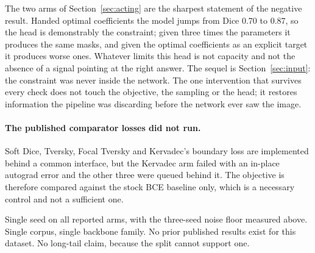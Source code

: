 \documentclass[11pt,letterpaper]{article}
\begin{document}
The two arms of Section~\ref{sec:acting} are the sharpest statement of the
negative result. Handed optimal coefficients the model jumps from Dice 0.70 to
0.87, so the head is demonstrably the constraint; given three times the
parameters it produces the same masks, and given the optimal coefficients as an
explicit target it produces worse ones. Whatever limits this head is not
capacity and not the absence of a signal pointing at the right answer. The sequel is
Section~\ref{sec:input}: the constraint was never inside the network. The one
intervention that survives every check does not touch the objective, the
sampling or the head; it restores information the pipeline was discarding
before the network ever saw the image.

\paragraph{The published comparator losses did not run.} Soft Dice, Tversky,
Focal Tversky and Kervadec's boundary loss are implemented behind a common
interface, but the Kervadec arm failed with an in-place autograd error and the
other three were queued behind it. The objective is therefore compared against
the stock BCE baseline only, which is a necessary control and not a sufficient
one.

Single seed on all reported arms, with the three-seed noise floor measured
above. Single corpus, single backbone family. No prior published results exist
for this dataset. No long-tail claim, because the split cannot support one.

{\small


}
\end{document}
